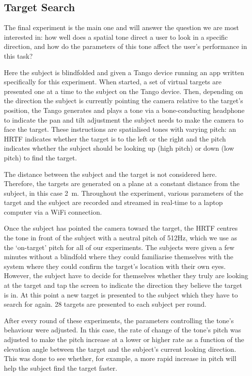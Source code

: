 \documentclass[format=sigconf, review=true, screen=true, anonymous=true]{acmart}
\begin{document}
\subsection{Target Search}

The final experiment is the main one and will answer the question we are most interested in: how well does a spatial tone direct a user to look in a specific direction, and how do the parameters of this tone affect the user's performance in this task? 

Here the subject is blindfolded and given a Tango device running an app written specifically for this experiment. When started, a set of virtual targets are presented one at a time to the subject on the Tango device. Then, depending on the direction the subject is currently pointing the camera relative to the target's position, the Tango generates and plays a tone via a bone-conducting headphone to indicate the pan and tilt adjustment the subject needs to make the camera to face the target. These instructions are spatialised tones with varying pitch: an HRTF indicates whether the target is to the left or the right and the pitch indicates whether the subject should be looking up (high pitch) or down (low pitch) to find the target. 

The distance between the subject and the target is not considered here. Therefore, the targets are generated on a plane at a constant distance from the subject, in this case \SI{2}{\m}. Throughout the experiment, various parameters of the target and the subject are recorded and streamed in real-time to a laptop computer via a WiFi connection.

Once the subject has pointed the camera toward the target, the HRTF centres the tone in front of the subject with a neutral pitch of 512Hz, which we use as the `on-target' pitch for all of our experiments. The subjects were given a few minutes without a blindfold where they could familiarise themselves with the system where they could confirm the target's location with their own eyes. However, the subject have to decide for themselves whether they truly are looking at the target and tap the screen to indicate the direction they believe the target is in. At this point a new target is presented to the subject which they have to search for again. 28 targets are presented to each subject per round. 

After every round of these experiments, the parameters controlling the tone's behaviour were adjusted. In this case, the rate of change of the tone's pitch was adjusted to make the pitch increase at a lower or higher rate as a function of the elevation angle between the target and the subject's current looking direction. This was done to see whether, for example, a more rapid increase in pitch will help the subject find the target faster. 
\end{document}
